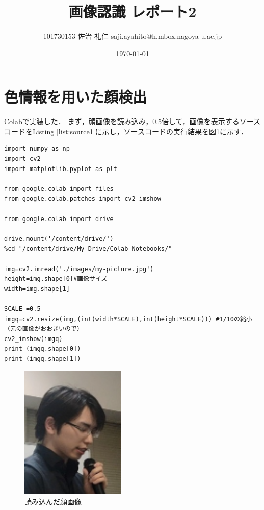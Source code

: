 \documentclass[uplatex]{jsarticle}
\title{画像認識 レポート2}
\author{101730153 佐治 礼仁 saji.ayahito@h.mbox.nagoya-u.ac.jp}
\date{\today}
\begin{document}
\maketitle
\section{色情報を用いた顔検出}
Colabで実装した．
まず，顔画像を読み込み，0.5倍して，画像を表示するソースコードをListing \ref{list:source1}に示し，ソースコードの実行結果を図\ref{fig:result1}に示す．
\begin{lstlisting}[caption=画像読み込みのソースコード,label=list:source1]
import numpy as np
import cv2
import matplotlib.pyplot as plt

from google.colab import files
from google.colab.patches import cv2_imshow

from google.colab import drive

drive.mount('/content/drive/')
%cd "/content/drive/My Drive/Colab Notebooks/"

img=cv2.imread('./images/my-picture.jpg')
height=img.shape[0]#画像サイズ
width=img.shape[1]

SCALE =0.5
imgq=cv2.resize(img,(int(width*SCALE),int(height*SCALE))) #1/10の縮小　（元の画像がおおきいので）
cv2_imshow(imgq)
print (imgq.shape[0])
print (imgq.shape[1])
\end{lstlisting}

\begin{figure}[htbp]
  \begin{center}
    \includegraphics[clip,width=5.0cm]{figures/result1.png}
    \caption{読み込んだ顔画像}
    \label{fig:result1}
  \end{center}
\end{figure}
\end{document}
